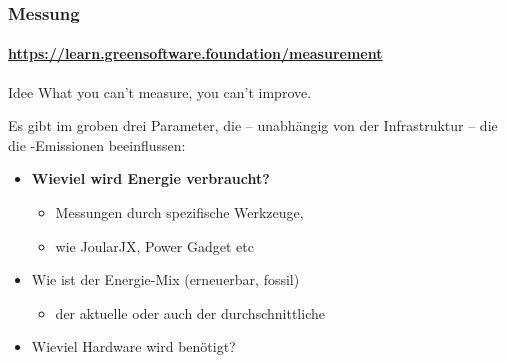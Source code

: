 \begin{frame}
\frametitle{Messung}
\framesubtitle{\href{https://learn.greensoftware.foundation/measurement}{https://learn.greensoftware.foundation/measurement}}
\begin{block}{Idee}
What you can't measure, you can't improve.
\end{block}

\pause
\vfill 

Es gibt im groben drei Parameter, die -- unabhängig von der Infrastruktur -- die die \COz-Emissionen beeinflussen:

\begin{itemize}
	\item \textbf<3->{{Wieviel wird Energie verbraucht?}	   }   
				\begin{itemize}
					\item Messungen durch spezifische Werkzeuge, 
					\item wie JoularJX, Power Gadget etc
\end{itemize}
   \item Wie ist der  Energie-Mix (erneuerbar, fossil)
	\begin{itemize}
		\item der aktuelle oder auch der durchschnittliche
	\end{itemize}
    \item Wieviel Hardware wird benötigt?
\end{itemize}

\end{frame}


